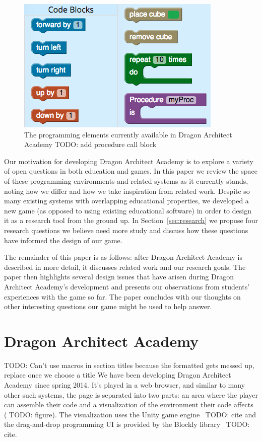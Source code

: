 \documentclass{sig-alternate}
\newcommand{\TODO}[1]{{\color{red} TODO: #1}}
\newcommand{\gametitle}{{\color{RoyalPurple} Dragon Architect Academy}}
\begin{document}
\begin{figure}[ht]
  \centering
  \includegraphics[width=\columnwidth]{images/toolbox_wide}
  \caption{The programming elements currently available in \gametitle{} \TODO{add procedure call block}}
  \label{fig:toolbox}
\end{figure}

Our motivation for developing \gametitle{} is to explore a variety of open questions in both education and games. 
In this paper we review the space of these programming environments and related systems as it currently stands, noting how we differ and how we take inspiration from related work.  
Despite so many existing systems with overlapping educational properties, we developed a new game (as opposed to using existing educational software) in order to design it as a research tool from the ground up.
In Section~\ref{sec:research} we propose four research questions we believe need more study and discuss how these questions have informed the design of our game. 

The remainder of this paper is as follows: after \gametitle{} is described in more detail, it discusses related work and our research goals. 
The paper then highlights several design issues that have arisen during \gametitle{}'s development and presents our observations from students' experiences with the game so far. 
The paper concludes with our thoughts on other interesting questions our game might be used to help answer.

\section{\gametitle{}}
\TODO{Can't use macros in section titles because the formatted gets messed up, replace once we choose a title}
We have been developing \gametitle{} since spring 2014. 
It's played in a web browser, and similar to many other such systems, the page is separated into two parts: an area where the player can assemble their code and a visualization of the environment their code affects (\TODO{figure}). 
The visualization uses the Unity game engine~\TODO{cite} and the drag-and-drop programming UI is provided by the Blockly library~\TODO{cite}.
\end{document}
